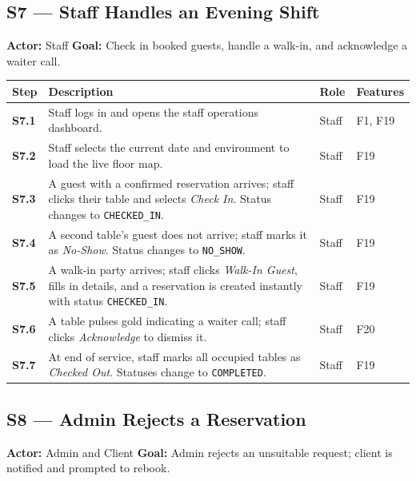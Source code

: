 \documentclass[12pt,a4paper,oneside]{report}
\begin{document}
\subsection*{S7 --- Staff Handles an Evening Shift}
\begin{mdframed}[style=scenariobox]
\textbf{Actor:} Staff \quad
\textbf{Goal:} Check in booked guests, handle a walk-in, and acknowledge a
waiter call.
\end{mdframed}

\begin{longtable}{>{\bfseries}l L{6.2cm} l L{2.8cm}}
  \toprule
  Step & Description & Role & Features \\
  \midrule
  S7.1 & Staff logs in and opens the staff operations dashboard. & Staff & F1, F19 \\
  S7.2 & Staff selects the current date and environment to load the live floor
         map. & Staff & F19 \\
  S7.3 & A guest with a confirmed reservation arrives; staff clicks their table
         and selects \emph{Check In}. Status changes to \texttt{CHECKED\_IN}. & Staff & F19 \\
  S7.4 & A second table's guest does not arrive; staff marks it as \emph{No-Show}.
         Status changes to \texttt{NO\_SHOW}. & Staff & F19 \\
  S7.5 & A walk-in party arrives; staff clicks \emph{Walk-In Guest}, fills in
         details, and a reservation is created instantly with status
         \texttt{CHECKED\_IN}. & Staff & F19 \\
  S7.6 & A table pulses gold indicating a waiter call; staff clicks
         \emph{Acknowledge} to dismiss it. & Staff & F20 \\
  S7.7 & At end of service, staff marks all occupied tables as \emph{Checked
         Out}. Statuses change to \texttt{COMPLETED}. & Staff & F19 \\
  \bottomrule
\end{longtable}

\subsection*{S8 --- Admin Rejects a Reservation}
\begin{mdframed}[style=scenariobox]
\textbf{Actor:} Admin and Client \quad
\textbf{Goal:} Admin rejects an unsuitable request; client is notified and
prompted to rebook.
\end{mdframed}
\end{document}

